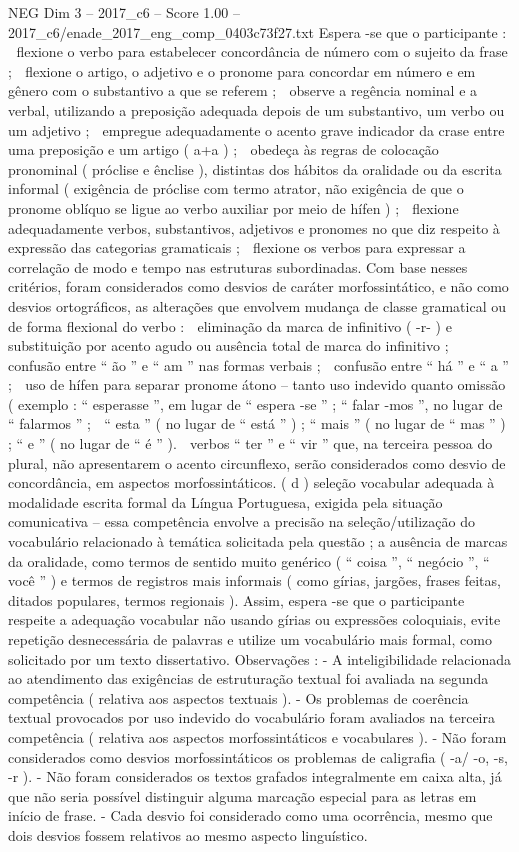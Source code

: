 \begin{textsample}{NEG Dim 3 – 2017\_c6 – Score 1.00 – 2017\_c6/enade\_2017\_eng\_comp\_0403c73f27.txt}
Espera -se que o participante :  flexione o verbo para estabelecer concordância de número com o sujeito da frase ;  flexione o artigo, o adjetivo e o pronome para concordar em número e em gênero com o substantivo a que se referem ;  observe a regência nominal e a verbal, utilizando a preposição adequada depois de um substantivo, um verbo ou um adjetivo ;  empregue adequadamente o acento grave indicador da crase entre uma preposição e um artigo ( a+a ) ;  obedeça às regras de colocação pronominal ( próclise e ênclise ), distintas dos hábitos da oralidade ou da escrita informal ( exigência de próclise com termo atrator, não exigência de que o pronome oblíquo se ligue ao verbo auxiliar por meio de hífen ) ;  flexione adequadamente verbos, substantivos, adjetivos e pronomes no que diz respeito à expressão das categorias gramaticais ;  flexione os verbos para expressar a correlação de modo e tempo nas estruturas subordinadas.
Com base nesses critérios, foram considerados como desvios de caráter morfossintático, e não como desvios ortográficos, as alterações que envolvem mudança de classe gramatical ou de forma flexional do verbo :  eliminação da marca de infinitivo ( -r- ) e substituição por acento agudo ou ausência total de marca do infinitivo ;  confusão entre “ ão ” e “ am ” nas formas verbais ;  confusão entre “ há ” e “ a ” ;  uso de hífen para separar pronome átono – tanto uso indevido quanto omissão ( exemplo : “ esperasse ”, em lugar de “ espera -se ” ; “ falar -mos ”, no lugar de “ falarmos ” ;  “ esta ” ( no lugar de “ está ” ) ; “ mais ” ( no lugar de “ mas ” ) ; “ e ” ( no lugar de “ é ” ).  verbos “ ter ” e “ vir ” que, na terceira pessoa do plural, não apresentarem o acento circunflexo, serão considerados como desvio de concordância, em aspectos morfossintáticos. ( d ) seleção vocabular adequada à modalidade escrita formal da Língua Portuguesa, exigida pela situação comunicativa – essa competência envolve a precisão na seleção/utilização do vocabulário relacionado à temática solicitada pela questão ; a ausência de marcas da oralidade, como termos de sentido muito genérico ( “ coisa ”, “ negócio ”, “ você ” ) e termos de registros mais informais ( como gírias, jargões, frases feitas, ditados populares, termos regionais ).
Assim, espera -se que o participante respeite a adequação vocabular não usando gírias ou expressões coloquiais, evite repetição desnecessária de palavras e utilize um vocabulário mais formal, como solicitado por um texto dissertativo.
Observações : - A inteligibilidade relacionada ao atendimento das exigências de estruturação textual foi avaliada na segunda competência ( relativa aos aspectos textuais ). - Os problemas de coerência textual provocados por uso indevido do vocabulário foram avaliados na terceira competência ( relativa aos aspectos morfossintáticos e vocabulares ). - Não foram considerados como desvios morfossintáticos os problemas de caligrafia ( -a/ -o, -s, -r ). - Não foram considerados os textos grafados integralmente em caixa alta, já que não seria possível distinguir alguma marcação especial para as letras em início de frase. - Cada desvio foi considerado como uma ocorrência, mesmo que dois desvios fossem relativos ao mesmo aspecto linguístico.

\end{textsample}
